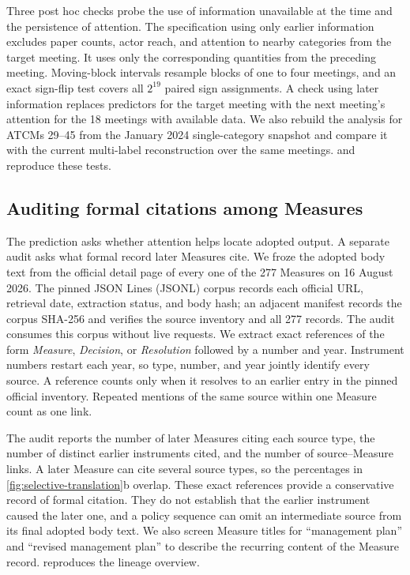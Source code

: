\documentclass{fun_article}
\begin{document}
Three post hoc checks probe the use of information unavailable at the time and the persistence of attention. The specification using only earlier information excludes paper counts, actor reach, and attention to nearby categories from the target meeting. It uses only the corresponding quantities from the preceding meeting. Moving-block intervals resample blocks of one to four meetings, and an exact sign-flip test covers all $2^{19}$ paired sign assignments. A check using later information replaces predictors for the target meeting with the next meeting's attention for the 18 meetings with available data. We also rebuild the analysis for ATCMs 29--45 from the January 2024 single-category snapshot and compare it with the current multi-label reconstruction over the same meetings. \texttt{} and \texttt{} reproduce these tests.

\subsection{Auditing formal citations among Measures}\label{sec:formal-inheritance-audit}
The prediction asks whether attention helps locate adopted output. A separate audit asks what formal record later Measures cite. We froze the adopted body text from the official detail page of every one of the 277 Measures on 16 August 2026. The pinned JSON Lines (JSONL) corpus records each official URL, retrieval date, extraction status, and body hash; an adjacent manifest records the corpus SHA-256 and verifies the source inventory and all 277 records. The audit consumes this corpus without live requests. We extract exact references of the form \emph{Measure}, \emph{Decision}, or \emph{Resolution} followed by a number and year. Instrument numbers restart each year, so type, number, and year jointly identify every source. A reference counts only when it resolves to an earlier entry in the pinned official inventory. Repeated mentions of the same source within one Measure count as one link.

The audit reports the number of later Measures citing each source type, the number of distinct earlier instruments cited, and the number of source--Measure links. A later Measure can cite several source types, so the percentages in \cref{fig:selective-translation}b overlap. These exact references provide a conservative record of formal citation. They do not establish that the earlier instrument caused the later one, and a policy sequence can omit an intermediate source from its final adopted body text. We also screen Measure titles for ``management plan'' and ``revised management plan'' to describe the recurring content of the Measure record. \texttt{} reproduces the lineage overview.
\end{document}

